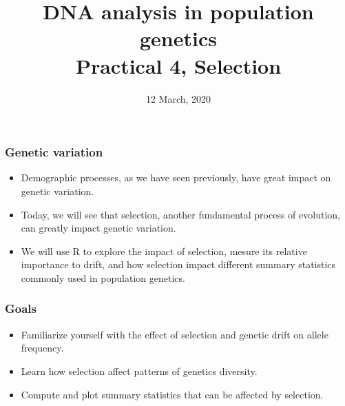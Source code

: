 \documentclass[8pt]{beamer}
\title{DNA analysis in population genetics\\
Practical 4, Selection}
\date{12 March, 2020}
\author{
    \texorpdfstring{
        \begin{columns}
              \column{.45\linewidth}
              \centering
              Chedly Kastally\\
              \href{mailto:chedly.kastally@oulu.fi}{chedly.kastally@oulu.fi}
              \column{.45\linewidth}
              \centering
              Tanja Pyh{\"a}j{\"a}rvi\\
              \href{mailto:tanja.pyhajarvi@oulu.fi}{tanja.pyhajarvi@oulu.fi}
        \end{columns}
    }
    {Kastally, Chedly \and Tanja Pyh{\"a}j{\"a}rvi}
}
\begin{document}
\begin{frame}
\titlepage
\end{frame}

\begin{frame}
    \frametitle{Genetic variation}

    \begin{itemize}
    
        \item<1-> Demographic processes, as we have seen previously,
            have great impact on genetic variation.

        \item<2-> Today, we will see that selection, another fundamental
            process of evolution, can greatly impact genetic variation.

        \item<3-> We will use R to explore the impact of selection,
            mesure its relative importance to drift, and how selection
            impact different summary statistics commonly used in
            population genetics.

    \end{itemize}


\end{frame}

\begin{frame}
    \frametitle{Goals}

\begin{itemize}

    \item Familiarize yourself with the effect of selection and genetic drift on allele 
    frequency.

    \item Learn how selection affect patterns of genetics diversity.

    \item Compute and plot summary statistics that can be affected by selection.

\end{itemize}
    
\end{frame}
\end{document}
